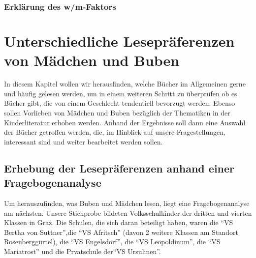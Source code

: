\subsection{Erklärung des w/m-Faktors}

\chapter{Unterschiedliche Lesepräferenzen von Mädchen und Buben}

In diesem Kapitel wollen wir herausfinden, welche Bücher im Allgemeinen
gerne und häufig gelesen werden, um in einem weiteren Schritt zu
überprüfen ob es Bücher gibt, die von einem Geschlecht tendentiell
bevorzugt werden. Ebenso sollen Vorlieben von Mädchen und Buben
bezüglich der Thematiken in der Kinderliteratur erhoben werden. Anhand
der Ergebnisse soll dann eine Auswahl der Bücher getroffen werden, die,
im Hinblick auf unsere Fragestellungen, interessant sind und weiter
bearbeitet werden sollen.

\section{Erhebung der Lesepräferenzen anhand einer Fragebogenanalyse}

Um herauszufinden, was Buben und Mädchen lesen, liegt eine
Fragebogenanalyse am nächsten. Unsere Stichprobe bildeten
Volksschulkinder der dritten und vierten Klassen in Graz. Die Schulen,
die sich daran beteiligt haben, waren die ``VS Bertha von Suttner'',die
``VS Afritsch'' (davon 2 weitere Klassen am Standort Rosenberggürtel),
die ``VS Engelsdorf'', die ``VS Leopoldinum'', die ``VS Mariatrost'' und
die Prvatschule der``VS Ursulinen''.

